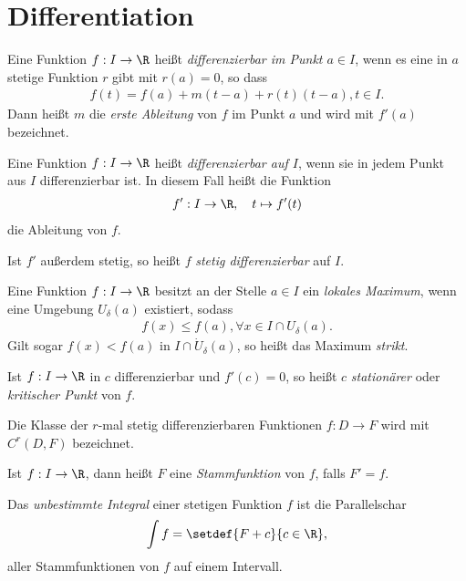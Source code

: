 \section{Differentiation}

\begin{defn}
Eine Funktion $f: I \to \R$ heißt \emph{differenzierbar im Punkt $a\in I$}, wenn
es eine in $a$ stetige Funktion $r$ gibt mit $r(a)=0$, so dass
\begin{align*}
f(t) = f(a) + m(t-a) + r(t)(t-a), t\in I.
\end{align*}
Dann heißt $m$ die \emph{erste Ableitung} von $f$ im Punkt $a$ und wird mit
$f'(a)$ bezeichnet.
\end{defn}
\begin{defn}
Eine Funktion $f: I\to \R$ heißt \emph{differenzierbar auf $I$}, wenn sie in
jedem Punkt aus $I$ differenzierbar ist. In diesem Fall heißt die Funktion
\begin{align*}
f': I\to \R,\quad t\mapsto f'(t)
\end{align*}
die Ableitung von $f$.

Ist $f'$ außerdem stetig, so heißt $f$ \emph{stetig differenzierbar} auf
$I$.
\end{defn}
\begin{defn} Eine Funktion $f: I\to \R$ besitzt an der Stelle 
$a\in I$ ein \emph{lokales Maximum}, wenn eine Umgebung $U_\delta(a)$ existiert,
sodass
\begin{align*}
f(x) \le f(a), \forall x\in I\cap U_\delta(a).
\end{align*}
Gilt sogar $f(x) < f(a)$ in $I\cap\dot{U}_\delta(a)$, so heißt das Maximum
\emph{strikt}.
\end{defn}
\begin{defn}
Ist $f: I\to\R$ in $c$ differenzierbar und $f'(c) = 0$, so heißt $c$
\emph{stationärer} oder \emph{kritischer Punkt} von $f$.
\end{defn}
\begin{defn}
Die Klasse der $r$-mal stetig differenzierbaren Funktionen $f: D\to F$ wird mit
\emph{$C^{r}(D,F)$} bezeichnet.
\end{defn}
\begin{defn}
Ist $f: I\to\R$, dann heißt $F$ eine \emph{Stammfunktion} von $f$, falls $F' =
f$.
\end{defn}
\begin{defn}
Das \emph{unbestimmte Integral} einer stetigen Funktion $f$ ist die
Parallelschar
\begin{align*}
\int f = \setdef{F + c}{c\in\R},
\end{align*}
aller Stammfunktionen von $f$ auf einem Intervall.
\end{defn}
